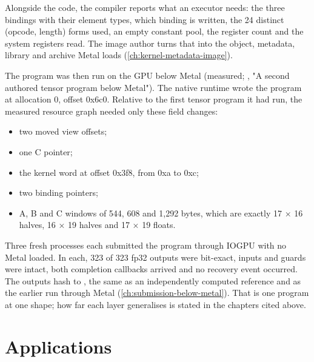 Alongside the code, the compiler reports what an executor needs: the three bindings with their element types, which
binding is written, the 24 distinct (opcode, length) forms used, an empty constant pool, the register count and
the system registers read. The image author turns that into the object, metadata, library and archive Metal loads (\cref{ch:kernel-metadata-image}).

The program was then run on the GPU below Metal (measured; , "A second authored tensor program
below Metal"). The native runtime wrote the program at allocation 0, offset 0x6c0. Relative to the first tensor
program it had run, the measured resource graph needed only these field changes:

\begin{itemize}
\item two moved view offsets;
\item one C pointer;
\item the kernel word at offset 0x3f8, from 0xa to 0xc;
\item two binding pointers;
\item A, B and C windows of 544, 608 and 1,292 bytes, which are exactly 17 × 16 halves, 16 × 19 halves and 17 × 19 floats.
\end{itemize}

Three fresh processes each submitted the program through IOGPU with no Metal loaded. In each, 323 of 323 fp32 outputs
were bit-exact, inputs and guards were intact, both completion callbacks arrived and no recovery event occurred. The
outputs hash to , the same as an independently
computed reference and as the earlier run through Metal (\cref{ch:submission-below-metal}). That is one program at one
shape; how far each layer generalises is stated in the chapters cited above.

\section{Applications}\label{sec:understanding-supports}

